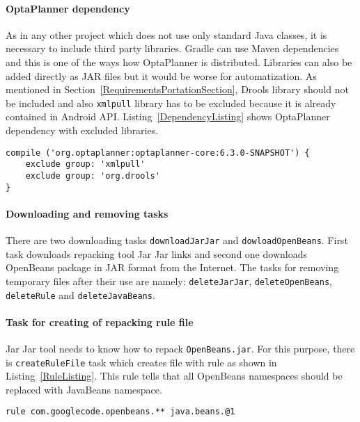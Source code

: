 \paragraph{OptaPlanner dependency}
As in any other project which does not use only standard Java classes, it is necessary to include third party libraries.
Gradle can use Maven dependencies and this is one of the ways how OptaPlanner is distributed. Libraries can also be
added directly as JAR files but it would be worse for automatization. As mentioned in
Section~\ref{RequirementsPortationSection}, Drools library should not be included and also \texttt{xmlpull} library has
to be excluded because it is already contained in Android API. Listing~\ref{DependencyListing} shows OptaPlanner
dependency with excluded libraries.
\\
\begin{lstlisting}[captionpos={b},caption={OptaPlanner Maven dependency in Gradle build script.},frame={lines},
label={DependencyListing},basicstyle=\footnotesize]
compile ('org.optaplanner:optaplanner-core:6.3.0-SNAPSHOT') {
    exclude group: 'xmlpull'
    exclude group: 'org.drools'
}
\end{lstlisting}

\paragraph{Downloading and removing tasks}
There are two downloading tasks \texttt{downloadJarJar} and \texttt{dowloadOpenBeans}. First task downloads repacking
tool Jar Jar links and second one downloads OpenBeans package in JAR format from the Internet. The tasks for removing
temporary files after their use are namely: \texttt{deleteJarJar}, \texttt{deleteOpenBeans}, \texttt{deleteRule} and
\texttt{deleteJavaBeans}.

\paragraph{Task for creating of repacking rule file}
Jar Jar tool needs to know how to repack \texttt{OpenBeans.jar}. For this purpose, there is \texttt{createRuleFile} task
which creates file with rule as shown in Listing~\ref{RuleListing}. This rule tells that all OpenBeans namespaces should
be replaced with JavaBeans namespace.
\\
\begin{lstlisting}[captionpos={b},caption={Jar Jar Links rule for repacking OpenBeans to Java core namespace.},
frame={lines},label={RuleListing},basicstyle=\footnotesize]
rule com.googlecode.openbeans.** java.beans.@1
\end{lstlisting}

